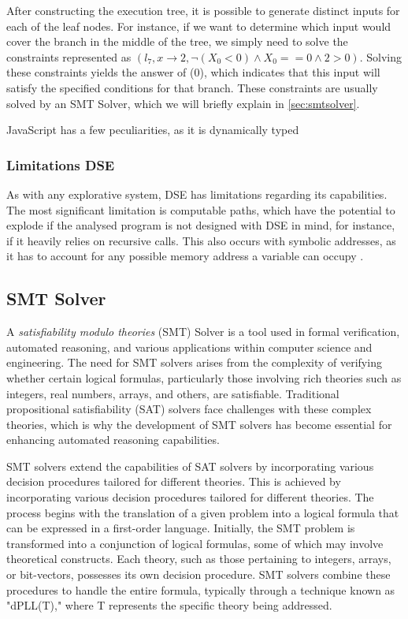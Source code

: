 \newpage
After constructing the execution tree, it is possible to generate distinct inputs for each of the leaf nodes. For instance, if we want to determine which input would cover the branch in the middle of the tree, we simply need to solve the constraints represented as  $(l_7, x \rightarrow 2, \neg(X_0 < 0) \land X_0 == 0 \land 2 > 0)$. Solving these constraints yields the answer of (0), which indicates that this input will satisfy the specified conditions for that branch.
These constraints are usually solved by an SMT Solver, which we will briefly explain in \autoref{sec:smtsolver}.


JavaScript has a few peculiarities, as it is dynamically typed 

\subsubsection{Limitations DSE}

As with any explorative system, DSE has limitations regarding its capabilities. 
The most significant limitation is computable paths, which have the potential to explode if the analysed program is not designed with DSE in mind, for instance, if it heavily relies on recursive calls.
This also occurs with symbolic addresses, as it has to account for any possible memory address a variable can occupy \cite{elkarablieh_precise_2009}.  


\subsection{SMT Solver}
\label{sec:smtsolver}

A \textit{satisfiability modulo theories }(SMT) Solver is a tool used in formal verification, automated reasoning, and various applications within computer science and engineering. The need for SMT solvers arises from the complexity of verifying whether certain logical formulas, particularly those involving rich theories such as integers, real numbers, arrays, and others, are satisfiable. Traditional propositional satisfiability (SAT) solvers face challenges with these complex theories, which is why the development of SMT solvers has become essential for enhancing automated reasoning capabilities.

SMT solvers extend the capabilities of SAT solvers by incorporating various decision procedures tailored for different theories. This is achieved by incorporating various decision procedures tailored for different theories. The process begins with the translation of a given problem into a logical formula that can be expressed in a first-order language. Initially, the SMT problem is transformed into a conjunction of logical formulas, some of which may involve theoretical constructs. Each theory, such as those pertaining to integers, arrays, or bit-vectors, possesses its own decision procedure. SMT solvers combine these procedures to handle the entire formula, typically through a technique known as "dPLL(T)," where T represents the specific theory being addressed.


